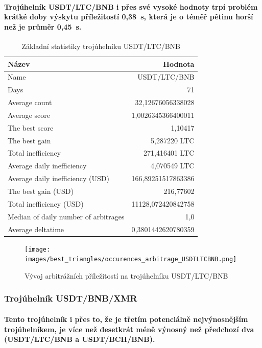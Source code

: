 \documentclass[thesis=B,czech]{FITthesis}[2019/03/21]
\begin{document}
\paragraph{
Trojúhelník USDT/LTC/BNB i přes své vysoké hodnoty trpí problém krátké doby výskytu příležitostí 0,38~s, která je o téměř pětinu horší než je průměr 0,45~s.
}
\begin{table}\centering
\caption{Základní statistiky trojúhelníku USDT/LTC/BNB}
\label{USDTLTCBNB_stats}
\begin{tabular}{|| l | r ||}
\hline Název & Hodnota \\ 
\hline\hline Name & USDT/LTC/BNB \\ 
\hline Days & 71 \\ 
\hline Average count & 32,12676056338028 \\ 
\hline Average score & 1,0026345366400011 \\ 
\hline The best score & 1,10417 \\ 
\hline The best gain & 5,287220 LTC \\ 
\hline Total inefficiency & 271,416401 LTC \\ 
\hline Average daily inefficiency & 4,070549 LTC \\ 
\hline Average daily inefficiency (USD) & 166,89251517863386 \\ 
\hline The best gain (USD) & 216,77602 \\ 
\hline Total inefficiency (USD) & 11128,072420842758 \\ 
\hline Median of daily number of arbitrages & 1,0 \\ 
\hline Average deltatime & 0,3801442620780359 \\ 
\hline
\end{tabular}
\end{table}

\begin{figure}\centering
	\texttt{[image: images/best\_triangles/occurences\_arbitrage\_USDTLTCBNB.png]}
	\caption{Vývoj arbitrážních příležitostí na trojúhelníku USDT/LTC/BNB }\label{occurences_arbitrage_USDTLTCBNB}
\end{figure}

\subsubsection{Trojúhelník USDT/BNB/XMR}
\paragraph{
Tento trojúhelník i přes to, že je třetím potenciálně nejvýnosnějším trojúhelníkem, je více než desetkrát méně výnosný než předchozí dva (USDT/LTC/BNB a USDT/BCH/BNB).
}
\end{document}
